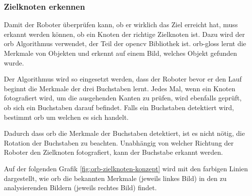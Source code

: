 \subsubsection{Zielknoten erkennen}

Damit der Roboter überprüfen kann, ob er wirklich das Ziel erreicht hat, muss erkannt werden können, ob ein Knoten der richtige Zielknoten ist. Dazu wird der \acrfull{orb} Algorithmus verwendet, der Teil der \gls{opencv} Bibliothek ist. \gls{orb-gloss} lernt die Merkmale von Objekten und erkennt auf einem Bild, welches Objekt gefunden wurde.

Der Algorithmus wird so eingesetzt werden, dass der Roboter bevor er den Lauf beginnt die Merkmale der drei Buchstaben lernt. Jedes Mal, wenn ein Knoten fotografiert wird, um die ausgehenden Kanten zu prüfen, wird ebenfalls geprüft, ob sich ein Buchstaben darauf befindet. Falls ein Buchstaben detektiert wird, bestimmt \acrshort{orb} um welchen es sich handelt.

Dadurch dass \acrshort{orb} die Merkmale der Buchstaben detektiert, ist es nicht nötig, die Rotation der Buchstaben zu beachten. Unabhängig von welcher Richtung der Roboter den Zielknoten fotografiert, kann der Buchstabe erkannt werden.

Auf der folgenden Grafik \ref{fig:orb-zielknoten-konzept} wird mit den farbigen Linien dargestellt, wie \acrshort{orb} die bekannten Merkmale (jeweils linkes Bild) in den zu analysierenden Bildern (jeweils rechtes Bild) findet.

